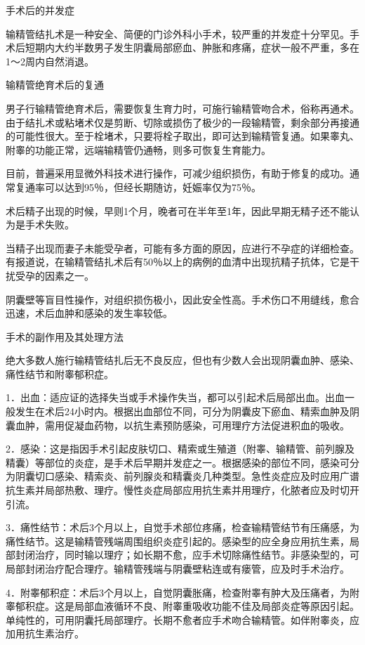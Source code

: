 \documentclass[12pt,UTF8,openany]{ctexbook}
\begin{document}
手术后的并发症


输精管结扎术是一种安全、简便的门诊外科小手术，较严重的并发症十分罕见。手术后短期内大约半数男子发生阴囊局部瘀血、肿胀和疼痛，症状一般不严重，多在1～2周内自然消退。





输精管绝育术后的复通


男子行输精管绝育术后，需要恢复生育力时，可施行输精管吻合术，俗称再通术。由于结扎术或粘堵术仅是剪断、切除或损伤了极少的一段输精管，剩余部分再接通的可能性很大。至于栓堵术，只要将栓子取出，即可达到输精管复通。如果睾丸、附睾的功能正常，远端输精管仍通畅，则多可恢复生育能力。

目前，普遍采用显微外科技术进行操作，可减少组织损伤，有助于修复的成功。通常复通率可以达到95％，但经长期随访，妊娠率仅为75％。

术后精子出现的时候，早则1个月，晚者可在半年至1年，因此早期无精子还不能认为是手术失败。

当精子出现而妻子未能受孕者，可能有多方面的原因，应进行不孕症的详细检查。有报道说，在输精管结扎术后有50％以上的病例的血清中出现抗精子抗体，它是干扰受孕的因素之一。

阴囊壁等盲目性操作，对组织损伤极小，因此安全性高。手术伤口不用缝线，愈合迅速，术后血肿和感染的发生率较低。





手术的副作用及其处理方法


绝大多数人施行输精管结扎后无不良反应，但也有少数人会出现阴囊血肿、感染、痛性结节和附睾郁积症。

1．出血：适应证的选择失当或手术操作失当，都可以引起术后局部出血。出血一般发生在术后24小时内。根据出血部位不同，可分为阴囊皮下瘀血、精索血肿及阴囊血肿，需用促凝血药物，以抗生素预防感染，可用理疗方法促进积血的吸收。

2．感染：这是指因手术引起皮肤切口、精索或生殖道（附睾、输精管、前列腺及精囊）等部位的炎症，是手术后早期并发症之一。根据感染的部位不同，感染可分为阴囊切口感染、精索炎、前列腺炎和精囊炎几种类型。急性炎症应及时应用广谱抗生素并局部热敷、理疗。慢性炎症局部应用抗生素并用理疗，化脓者应及时切开引流。

3．痛性结节：术后3个月以上，自觉手术部位疼痛，检查输精管结节有压痛感，为痛性结节。这是输精管残端周围组织炎症引起的。感染型的应全身应用抗生素，局部封闭治疗，同时输以理疗；如长期不愈，应手术切除痛性结节。非感染型的，可局部封闭治疗配合理疗。输精管残端与阴囊壁粘连或有瘘管，应及时手术治疗。

4．附睾郁积症：术后3个月以上，自觉阴囊胀痛，检查附睾有肿大及压痛者，为附睾郁积症。这是局部血液循环不良、附睾重吸收功能不佳及局部炎症等原因引起。单纯性的，可用阴囊托局部理疗。长期不愈者应手术吻合输精管。如伴附睾炎，应加用抗生素治疗。
\end{document}
